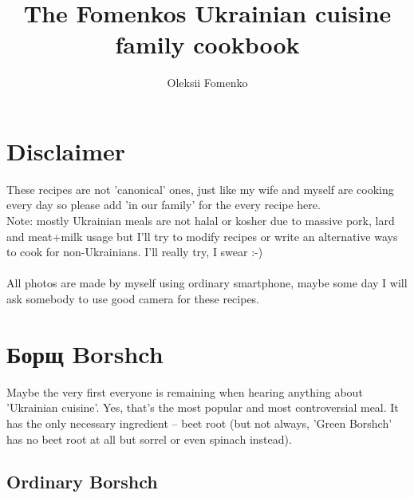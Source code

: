 \documentclass[11pt,a4paper]{article}
\title{\textbf{The Fomenkos Ukrainian cuisine family cookbook}}
\author{Oleksii Fomenko}
\date{}
\begin{document}
\section*{Disclaimer}
These recipes are not 'canonical' ones, just like my wife and myself are cooking every day so please add 'in our family' for the every recipe here.
\\

Note: mostly Ukrainian meals are not halal or kosher due to massive pork, lard and meat+milk usage but I'll try to modify recipes or write an alternative ways to cook for non-Ukrainians. I'll really try, I swear :-)
\\
\\
All photos are made by myself using ordinary smartphone, maybe some day I will ask somebody to use good camera for these recipes.
\\

\section*{Борщ Borshch \textipa{['bO:rS]}}
Maybe the very first everyone is remaining when hearing anything about 'Ukrainian cuisine'.
Yes, that's the most popular and most controversial meal. It has the only necessary ingredient -- beet root (but not always, 'Green Borshch' has no beet root at all but sorrel or even spinach instead).

\subsection*{Ordinary Borshch}

\doclicenseThis
\end{document}
